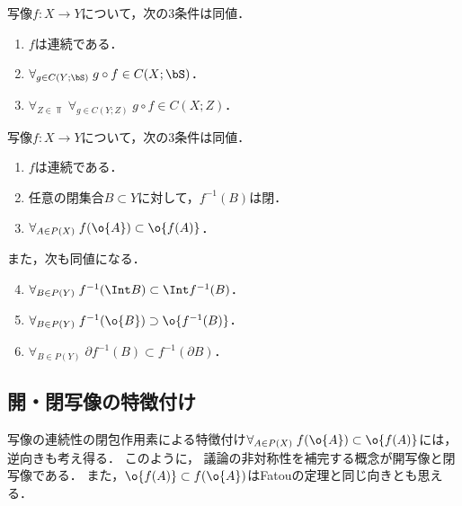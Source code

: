 \documentclass[uplatex,dvipdfmx]{jsreport}
\begin{document}
\begin{theorem}[圏論的特徴付け]
    写像$f:X\to Y$について，次の3条件は同値．
    \begin{enumerate}
        \item $f$は連続である．
        \item $\forall_{g\in C(Y;\bS)}\;g\circ f\in C(X;\bS)$．
        \item $\forall_{Z\in\Top}\;\forall_{g\in C(Y;Z)}\;g\circ f\in C(X;Z)$．
    \end{enumerate}
\end{theorem}

\begin{proposition}[閉集合と閉包による特徴付け]
    写像$f:X\to Y$について，次の3条件は同値．
    \begin{enumerate}
        \item $f$は連続である．
        \item 任意の閉集合$B\subset Y$に対して，$f^{-1}(B)$は閉．
        \item $\forall_{A\in P(X)}\;f(\o{A})\subset\o{f(A)}$．
    \end{enumerate}
    また，次も同値になる．
    \begin{enumerate}\setcounter{enumi}{3}
        \item $\forall_{B\in P(Y)}\;f^{-1}(\Int B)\subset\Int f^{-1}(B)$．
        \item $\forall_{B\in P(Y)}\;f^{-1}(\o{B})\supset\o{f^{-1}(B)}$．
        \item $\forall_{B\in P(Y)}\;\partial f^{-1}(B)\subset f^{-1}(\partial B)$．
    \end{enumerate}
\end{proposition}

\subsection{開・閉写像の特徴付け}

\begin{tcolorbox}[colframe=ForestGreen, colback=ForestGreen!10!white,breakable,colbacktitle=ForestGreen!40!white,coltitle=black,fonttitle=\bfseries\sffamily,
title=連続性以前の開・閉写像の観察]
    写像の連続性の閉包作用素による特徴付け$\forall_{A\in P(X)}\;f(\o{A})\subset\o{f(A)}$には，逆向きも考え得る．
    このように，
    議論の非対称性を補完する概念が開写像と閉写像である．
    また，$\o{f(A)}\subset f(\o{A})$はFatouの定理と同じ向きとも思える．
\end{tcolorbox}
\end{document}
